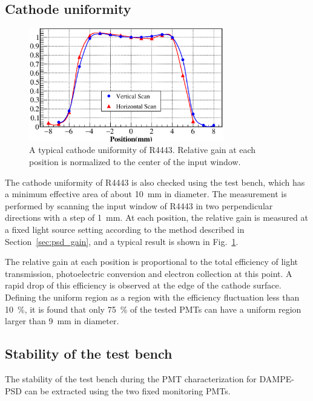 \documentclass{nst}
\begin{document}
\subsection{Cathode uniformity}
\label{sec:psd_cathodescan}

\begin{figure}[!tb]
	\centering
	\includegraphics[width=85mm]{FIG9}
	\caption{A typical cathode uniformity of R4443.
		Relative gain at each position is normalized to the center of the input window.}
	\label{fig:FIG9}
\end{figure} 

The cathode uniformity of R4443 is also checked using the test bench, which has a minimum effective area of about \SI{10}{\milli\meter} in diameter.
The measurement is performed by scanning the input window of R4443 in two perpendicular directions with a step of \SI{1}{\milli\meter}.
At each position, the relative gain is measured at a fixed light source setting according to the method described in Section~\ref{sec:psd_gain}, and a typical result is shown in Fig.~\ref{fig:FIG9}.

The relative gain at each position is proportional to the total efficiency of light transmission, photoelectric conversion and electron collection at this point.
A rapid drop of this efficiency is observed at the edge of the cathode surface. 
Defining the uniform region as a region with the efficiency fluctuation less than \SI{10}{\percent}, it is found that only \SI{75}{\percent} of the tested PMTs can have a uniform region larger than \SI{9}{\milli\meter} in diameter. 

\subsection{Stability of the test bench}
\label{sec:stability}

The stability of the test bench during the PMT characterization for DAMPE-PSD can be extracted using the two fixed monitoring PMTs.
\end{document}
